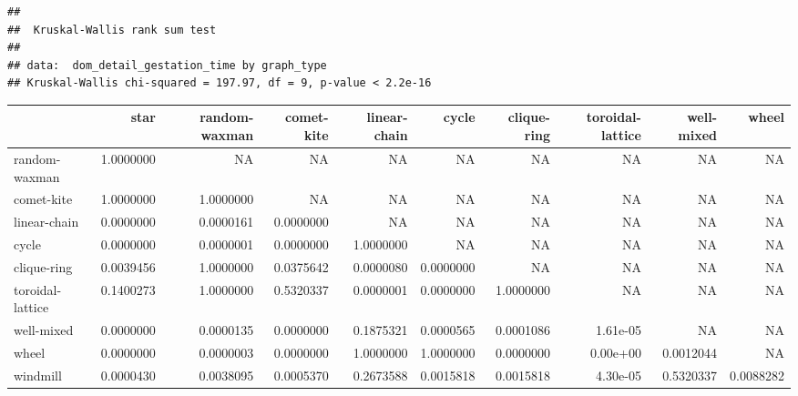 \documentclass[
]{book}
\newenvironment{Shaded}{\begin{snugshade}}{\end{snugshade}}
\newcommand{\AttributeTok}[1]{\textcolor[rgb]{0.77,0.63,0.00}{#1}}
\newcommand{\ConstantTok}[1]{\textcolor[rgb]{0.00,0.00,0.00}{#1}}
\newcommand{\FunctionTok}[1]{\textcolor[rgb]{0.00,0.00,0.00}{#1}}
\newcommand{\NormalTok}[1]{#1}
\newcommand{\OtherTok}[1]{\textcolor[rgb]{0.56,0.35,0.01}{#1}}
\newcommand{\SpecialCharTok}[1]{\textcolor[rgb]{0.00,0.00,0.00}{#1}}
\newcommand{\StringTok}[1]{\textcolor[rgb]{0.31,0.60,0.02}{#1}}
\begin{document}
\begin{verbatim}
## 
##  Kruskal-Wallis rank sum test
## 
## data:  dom_detail_gestation_time by graph_type
## Kruskal-Wallis chi-squared = 197.97, df = 9, p-value < 2.2e-16
\end{verbatim}

\begin{Shaded}
\end{Shaded}

\begin{table}
\centering
\begin{tabular}[t]{l|r|r|r|r|r|r|r|r|r}
\hline
  & star & random-waxman & comet-kite & linear-chain & cycle & clique-ring & toroidal-lattice & well-mixed & wheel\\
\hline
random-waxman & 1.0000000 & NA & NA & NA & NA & NA & NA & NA & NA\\
\hline
comet-kite & 1.0000000 & 1.0000000 & NA & NA & NA & NA & NA & NA & NA\\
\hline
linear-chain & 0.0000000 & 0.0000161 & 0.0000000 & NA & NA & NA & NA & NA & NA\\
\hline
cycle & 0.0000000 & 0.0000001 & 0.0000000 & 1.0000000 & NA & NA & NA & NA & NA\\
\hline
clique-ring & 0.0039456 & 1.0000000 & 0.0375642 & 0.0000080 & 0.0000000 & NA & NA & NA & NA\\
\hline
toroidal-lattice & 0.1400273 & 1.0000000 & 0.5320337 & 0.0000001 & 0.0000000 & 1.0000000 & NA & NA & NA\\
\hline
well-mixed & 0.0000000 & 0.0000135 & 0.0000000 & 0.1875321 & 0.0000565 & 0.0001086 & 1.61e-05 & NA & NA\\
\hline
wheel & 0.0000000 & 0.0000003 & 0.0000000 & 1.0000000 & 1.0000000 & 0.0000000 & 0.00e+00 & 0.0012044 & NA\\
\hline
windmill & 0.0000430 & 0.0038095 & 0.0005370 & 0.2673588 & 0.0015818 & 0.0015818 & 4.30e-05 & 0.5320337 & 0.0088282\\
\hline
\end{tabular}
\end{table}
\end{document}
